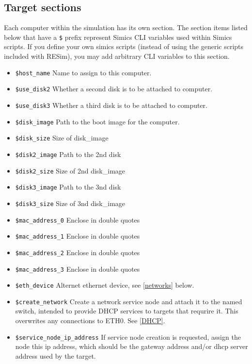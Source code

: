 \documentclass[titlepage]{article}
\begin{document}
\subsection{Target sections}
Each computer within the simulation has its own section. The section items listed below that 
have a {\tt \$} prefix represent Simics CLI variables used within Simics scripts.  If you define your own
simics scripts (instead of using the generic scripts included with RESim), you may add arbitrary CLI variables
to this section. 
\begin{itemize}
\item {\tt \$host\_name} Name to assign to this computer.
\item {\tt \$use\_disk2} Whether a second disk is to be attached to computer.
\item {\tt \$use\_disk3} Whether a third disk is to be attached to computer.
\item {\tt \$disk\_image} Path to the boot image for the computer.
\item {\tt \$disk\_size} Size of disk\_image
\item {\tt \$disk2\_image} Path to the 2nd disk
\item {\tt \$disk2\_size} Size of 2nd disk\_image
\item {\tt \$disk3\_image} Path to the 3nd disk
\item {\tt \$disk3\_size} Size of 3nd disk\_image
\item {\tt \$mac\_address\_0} Enclose in double quotes
\item {\tt \$mac\_address\_1} Enclose in double quotes
\item {\tt \$mac\_address\_2} Enclose in double quotes
\item {\tt \$mac\_address\_3} Enclose in double quotes
\item {\tt \$eth\_device} Alternet ethernet device, see \ref{networks} below.
\item {\tt \$create\_network} Create a network service node and attach it to the named switch, intended
to provide DHCP services to targets that requrire it. This overwrites any connections to ETH0.  See \ref{DHCP}.
\item {\tt \$service\_node\_ip\_address} If service node creation is requested, assign the node this ip address, which
should be the gateway address and/or dhcp server address used by the target.


\end{itemize}
\end{document}
